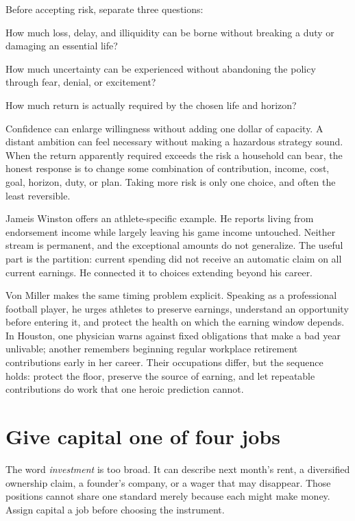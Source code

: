 Before accepting risk, separate three questions:

\begin{description}[leftmargin=2.8em,style=nextline]
\item[Capacity] How much loss, delay, and illiquidity can be borne without
  breaking a duty or damaging an essential life?
\item[Willingness] How much uncertainty can be experienced without abandoning
  the policy through fear, denial, or excitement?
\item[Necessity] How much return is actually required by the chosen life and
  horizon?
\end{description}

Confidence can enlarge willingness without adding one dollar of capacity. A
distant ambition can feel necessary without making a hazardous strategy
sound. When the return apparently required exceeds the risk a household can
bear, the honest response is to change some combination of contribution,
income, cost, goal, horizon, duty, or plan. Taking more risk is only one choice,
and often the least reversible.

Jameis Winston offers an athlete-specific example. He reports living from
endorsement income while largely leaving his game income untouched. Neither
stream is permanent, and the exceptional amounts do not generalize. The useful
part is the partition: current spending did not receive an automatic claim on
all current earnings. He connected it to choices extending beyond his career.

Von Miller makes the same timing problem explicit. Speaking as a professional
football player, he urges athletes to preserve earnings, understand an
opportunity before entering it, and protect the health on which the earning
window depends. In Houston, one physician warns against fixed obligations that
make a bad year unlivable; another remembers beginning regular workplace
retirement contributions early in her career. Their occupations differ, but
the sequence holds: protect the floor, preserve the source of earning, and let
repeatable contributions do work that one heroic prediction cannot.

\section{Give capital one of four jobs}

The word \emph{investment} is too broad. It can describe next month's rent, a
diversified ownership claim, a founder's company, or a wager that may disappear.
Those positions cannot share one standard merely because each might make
money. Assign capital a job before choosing the instrument.

